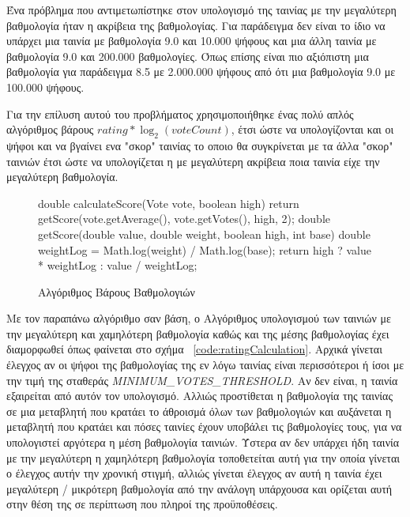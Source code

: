 Ένα πρόβλημα που αντιμετωπίστηκε στον υπολογισμό της ταινίας με την μεγαλύτερη βαθμολογία ήταν η ακρίβεια της βαθμολογίας. Για παράδειγμα δεν είναι το ίδιο να υπάρχει μια ταινία με βαθμολογία 9.0 και 10.000 ψήφους και μια άλλη ταινία με βαθμολογία 9.0 και 200.000 βαθμολογίες. Όπως επίσης είναι πιο αξιόπιστη μια βαθμολογία για παράδειγμα 8.5 με 2.000.000 ψήφους από ότι μια βαθμολογία 9.0 με 100.000 ψήφους. 

Για την επίλυση αυτού του προβλήματος χρησιμοποιήθηκε ένας πολύ απλός αλγόριθμος βάρους $rating * \log_2(voteCount)$, έτσι ώστε να υπολογίζονται και οι ψήφοι και να βγαίνει ενα "σκορ" ταινίας το οποιο θα συγκρίνεται με τα άλλα "σκορ" ταινιών έτσι ώστε να υπολογίζεται η με μεγαλύτερη ακρίβεια ποια ταινία είχε την μεγαλύτερη βαθμολογία.
\begin{figure}[h]
    \begin{javacode}
double calculateScore(Vote vote, boolean high) {
    return getScore(vote.getAverage(), vote.getVotes(), high, 2);
}
double getScore(double value, double weight, boolean high, int base) {
    double weightLog = Math.log(weight) / Math.log(base);
    return high ? value * weightLog : value / weightLog;
}
    \end{javacode}
    \caption{Αλγόριθμος Βάρους Βαθμολογιών}
   \label{code:logarithmicScore}
\end{figure}

Με τον παραπάνω αλγόριθμο σαν βάση, ο Αλγόριθμος υπολογισμού των ταινιών με την μεγαλύτερη και χαμηλότερη βαθμολογία καθώς και της μέσης βαθμολογίας έχει διαμορφωθεί όπως φαίνεται στο σχήμα ~\ref{code:ratingCalculation}. Αρχικά γίνεται έλεγχος αν οι ψήφοι της βαθμολογίας της εν λόγω ταινίας είναι περισσότεροι ή ίσοι με την τιμή της σταθεράς {\it MINIMUM\_VOTES\_THRESHOLD}. Αν δεν είναι, η ταινία εξαιρείται από αυτόν τον υπολογισμό. Αλλιώς προστίθεται η βαθμολογία της ταινίας σε μια μεταβλητή που κρατάει το άθροισμά όλων των βαθμολογιών και αυξάνεται η μεταβλητή που κρατάει και πόσες ταινίες έχουν υποβάλει τις βαθμολογίες τους, για να υπολογιστεί αργότερα η μέση βαθμολογία ταινιών. Ύστερα αν δεν υπάρχει ήδη ταινία με την μεγαλύτερη η χαμηλότερη βαθμολογία τοποθετείται αυτή για την οποία γίνεται ο έλεγχος αυτήν την χρονική στιγμή, αλλιώς γίνεται έλεγχος αν αυτή η ταινία έχει μεγαλύτερη / μικρότερη βαθμολογία από την ανάλογη υπάρχουσα και ορίζεται αυτή στην θέση της σε περίπτωση που πληροί της προϋποθέσεις.

